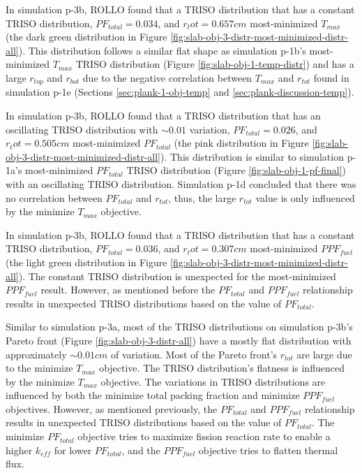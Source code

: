 In simulation p-3b, \gls{ROLLO} found that a TRISO distribution that has a 
constant TRISO distribution, $PF_{total} = 0.034$, and $r_tot=0.657cm$ most-minimized 
$T_{max}$ (the dark green distribution in Figure 
\ref{fig:slab-obj-3-distr-most-minimized-distr-all}).
This distribution follows a similar flat shape as simulation p-1b's most-minimized 
$T_{max}$ TRISO distribution (Figure \ref{fig:slab-obj-1-temp-distr}) and has a large 
$r_{top}$ and $r_{bot}$ due to the negative correlation between $T_{max}$ and $r_{tot}$
found in simulation p-1e (Sections \ref{sec:plank-1-obj-temp} and 
\ref{sec:plank-discussion-temp}). 

In simulation p-3b, \gls{ROLLO} found that a TRISO distribution that has an 
oscillating TRISO distribution with $\sim0.01$ variation, $PF_{total} = 0.026$, and 
$r_tot=0.505cm$ most-minimized $PF_{total}$
(the pink distribution in Figure \ref{fig:slab-obj-3-distr-most-minimized-distr-all}).
This distribution is similar to simulation p-1a's most-minimized $PF_{total}$ TRISO 
distribution (Figure \ref{fig:slab-obj-1-pf-final}) with an oscillating TRISO 
distribution.
Simulation p-1d concluded that there was no correlation between $PF_{total}$ and $r_{tot}$, 
thus, the large $r_{tot}$ value is only influenced by the minimize $T_{max}$ objective. 

In simulation p-3b, \gls{ROLLO} found that a TRISO distribution that has a 
constant TRISO distribution, $PF_{total} = 0.036$, and $r_tot=0.307cm$ most-minimized 
$PPF_{fuel}$ (the light green distribution in Figure 
\ref{fig:slab-obj-3-distr-most-minimized-distr-all}).
The constant TRISO distribution is unexpected for the most-minimized $PPF_{fuel}$ result. 
However, as mentioned before the $PF_{total}$ and $PPF_{fuel}$ relationship
results in unexpected TRISO distributions based on the value of $PF_{total}$. 

Similar to simulation p-3a, most of the \gls{TRISO} distributions on simulation 
p-3b's Pareto front (Figure \ref{fig:slab-obj-3-distr-all}) have a mostly flat 
distribution with approximately $\sim0.01cm$ of variation. 
Most of the Pareto front's $r_{tot}$ are large due to the minimize $T_{max}$ objective. 
The TRISO distribution's flatness is influenced by the minimize $T_{max}$ objective. 
The variations in \gls{TRISO} distributions are influenced by both the minimize 
total packing fraction and minimize $PPF_{fuel}$ objectives. 
However, as mentioned previously, the $PF_{total}$ and $PPF_{fuel}$ relationship
results in unexpected TRISO distributions based on the value of $PF_{total}$. 
The minimize $PF_{total}$ objective tries to maximize fission reaction rate
to enable a higher $k_{eff}$ for lower $PF_{total}$, and 
the $PPF_{fuel}$ objective tries to flatten thermal flux. 

